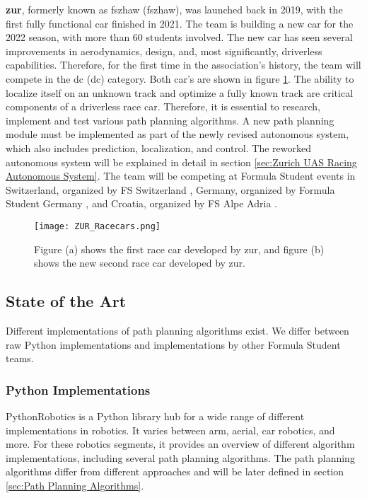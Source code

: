 \textbf{\acrlong{zur}}, formerly known as \acrlong{fszhaw} (\acrshort{fszhaw}), was launched back in 2019, with the first fully functional car finished in 2021. The team is building a new car for the 2022 season, with more than 60 students involved. The new car has seen several improvements in aerodynamics, design, and, most significantly, driverless capabilities. \cite{fszhaw_launch}
Therefore, for the first time in the association's history, the team will compete in the \acrlong{dc} (\acrshort{dc}) category. Both car's are shown in figure \ref{fig:ZUR Racecars}.
The ability to localize itself on an unknown track and optimize a fully known track are critical components of a driverless race car. Therefore, it is essential to research, implement and test various path planning algorithms. A new path planning module must be implemented as part of the newly revised autonomous system, which also includes prediction, localization, and control. The reworked autonomous system will be explained in detail in section \ref{sec:Zurich UAS Racing Autonomous System}.
The team will be competing at Formula Student events in Switzerland, organized by FS Switzerland \cite{fsswitzerland}, Germany, organized by Formula Student Germany \cite{fs_germany}, and Croatia, organized by FS Alpe Adria \cite{fs_alpe_adria}.
\begin{figure}[H]
    \centering
    \texttt{[image: ZUR\_Racecars.png]}
    \caption{Figure (a) shows the first race car developed by \acrshort{zur}, and figure (b) shows the new second race car developed by \acrshort{zur}.}
    \label{fig:ZUR Racecars}
\end{figure}

\subsection{State of the Art} \label{sec:State of the Art}
Different implementations of path planning algorithms exist. We differ between raw Python implementations and implementations by other Formula Student teams.

\subsubsection{Python Implementations} \label{sec:Python Implementations}
PythonRobotics is a Python library hub for a wide range of different implementations in robotics. It varies between arm, aerial, car robotics, and more.
For these robotics segments, it provides an overview of different algorithm implementations, including several path planning algorithms. \cite{python_robotics}
The path planning algorithms differ from different approaches and will be later defined in section \ref{sec:Path Planning Algorithms}.

